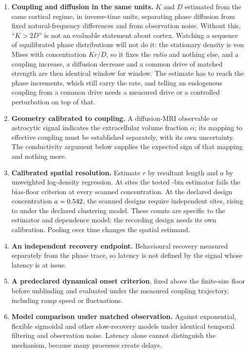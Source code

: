 \documentclass[11pt]{article}
\begin{document}
\begin{enumerate}[leftmargin=*,noitemsep]
\item \textbf{Coupling and diffusion in the same units.} $K$ and $D$ estimated
from the same cortical regime, in inverse-time units, separating phase
diffusion from fixed natural-frequency differences and from observation noise. Without
this, ``$K>2D$'' is not an evaluable statement about cortex. Watching a
sequence of equilibrated phase distributions will not do it: the stationary
density is von Mises with concentration $Kr/D$, so it fixes the \emph{ratio}
and nothing else, and a coupling increase, a diffusion decrease and a common
drive of matched strength are then identical window for window. The estimate
has to reach the phase increments, which still carry the rate, and telling an
endogenous coupling from a common drive needs a measured drive or a controlled
perturbation on top of that.
\item \textbf{Geometry calibrated to coupling.} A diffusion-MRI observable or
astrocytic signal indicates the extracellular volume fraction $\alpha$; its mapping
to effective coupling must be established separately, with its own uncertainty.
The conductivity argument below supplies the expected sign of that mapping and
nothing more.
\item \textbf{Calibrated spatial resolution.} Estimate $r$ by resultant length
and $a$ by unweighted log-density regression. At \designProtocolSites{} sites
the tested \designPublishedBins{}-bin estimator fails the bias-floor criterion
at every scanned concentration. At the declared design concentration
$a=0.542$, the scanned designs require
\designSitesIndependent{} independent sites, rising to
\designSitesClustered{} under the declared clustering model. These counts are
specific to the estimator and dependence model; the recording design needs
its own calibration. Pooling over time changes the spatial estimand.
\item \textbf{An independent recovery endpoint.} Behavioural recovery measured
separately from the phase trace, so latency is not defined by the signal whose
latency is at issue.
\item \textbf{A predeclared dynamical onset criterion}, fixed above the
finite-size floor before unblinding and evaluated under the measured coupling
trajectory, including ramp speed or fluctuations.
\item \textbf{Model comparison under matched observation.} Against exponential,
flexible sigmoidal and other slow-recovery models under identical temporal
filtering and observation noise. Latency alone cannot distinguish the
mechanism, because many processes create delays.
\end{enumerate}
\end{document}
